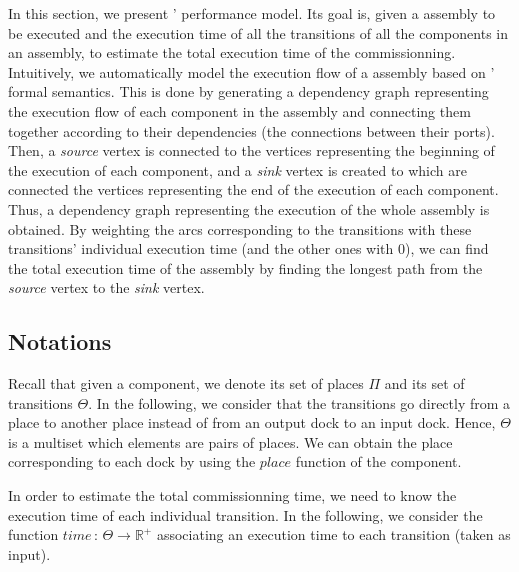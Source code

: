 In this section, we present \mad' performance model. Its goal is,
given a \mad assembly to be executed and the execution time of all the
transitions of all the components in an assembly, to estimate the total
execution time of the commissionning.
%
Intuitively, we automatically model the execution flow of a \mad
assembly based on \mad' formal semantics. This is done by generating a
dependency graph representing the execution flow of each \mad
component in the assembly and connecting them together according to their
dependencies (the connections between their ports). Then, a
\emph{source} vertex is connected to the vertices representing the beginning of
the execution of each component, and a \emph{sink} vertex is created to which
are connected the vertices representing the end of the execution of each
component.
%
Thus, a dependency graph representing the execution of the whole
assembly is obtained. By weighting the arcs corresponding to the transitions with
these transitions' individual execution time (and the other ones with 0),
we can find the total execution time of the assembly by finding the longest
path from the \emph{source} vertex to the \emph{sink} vertex.


\subsection{Notations}

Recall that given a component, we denote its set of places $\Pi$ and its
set of transitions $\Theta$. In the following, we consider that the
transitions go directly from a place to
another place instead of from an output dock to an input dock.
Hence, $\Theta$ is a multiset which elements are pairs of places. We
can obtain the place corresponding to each dock by using the $place$
function of the component.

In order to estimate the total commissionning time, we need to know the
execution time of each individual transition. In the following, we
consider the function $time\,:\,\Theta\rightarrow\mathbb{R}^{+}$
associating an execution time to each transition (taken as input).

